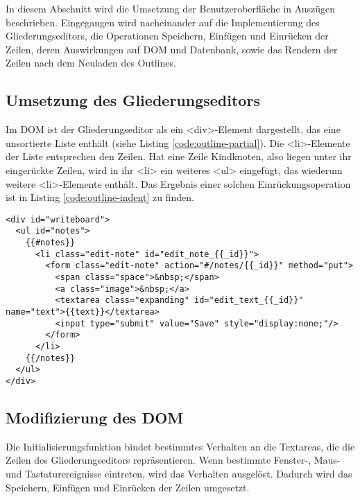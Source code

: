 In diesem Abschnitt wird die Umsetzung der Benutzeroberfläche in Auszügen beschrieben. Eingegangen wird nacheinander auf die Implementierung des Gliederungseditors, die Operationen Speichern, Einfügen und Einrücken der Zeilen, deren Auswirkungen auf DOM und Datenbank, sowie das Rendern der Zeilen nach dem Neuladen des Outlines.



\subsection{Umsetzung des Gliederungseditors}

Im DOM ist der Gliederungseditor als ein {\selectfont <div>}-Element dargestellt, das eine unsortierte Liste enthält (siehe Listing \ref{code:outline-partial}). Die {\selectfont <li>}-Elemente der Liste entsprechen den Zeilen. Hat eine Zeile Kindknoten, also liegen unter ihr eingerückte Zeilen, wird in ihr {\selectfont <li>} ein weiteres {\selectfont <ul>} eingefügt, das wiederum weitere {\selectfont <li>}-Elemente enthält. Das Ergebnis einer solchen Einrückungsoperation ist in Listing \ref{code:outline-indent} zu finden.

\lstset{language=html}
\medskip 
\begin{lstlisting}[label=code:outline-partial, caption=Das Template für den Gliederungseditor in Mustache-Syntax]
<div id="writeboard">
  <ul id="notes">
    {{#notes}}
      <li class="edit-note" id="edit_note_{{_id}}">
        <form class="edit-note" action="#/notes/{{_id}}" method="put">
          <span class="space">&nbsp;</span>
          <a class="image">&nbsp;</a>
          <textarea class="expanding" id="edit_text_{{_id}}" name="text">{{text}}</textarea>
          <input type="submit" value="Save" style="display:none;"/>
        </form>
      </li>
    {{/notes}}
  </ul>
</div>
\end{lstlisting}


\subsection{Modifizierung des DOM}

Die Initialisierungsfunktion bindet bestimmtes Verhalten an die Textareas, die die Zeilen des Gliederungseditors repräsentieren. Wenn bestimmte Fenster-, Maus- und Tastaturereignisse eintreten, wird das Verhalten ausgelöst. Dadurch wird das Speichern, Einfügen und Einrücken der Zeilen umgesetzt. 

